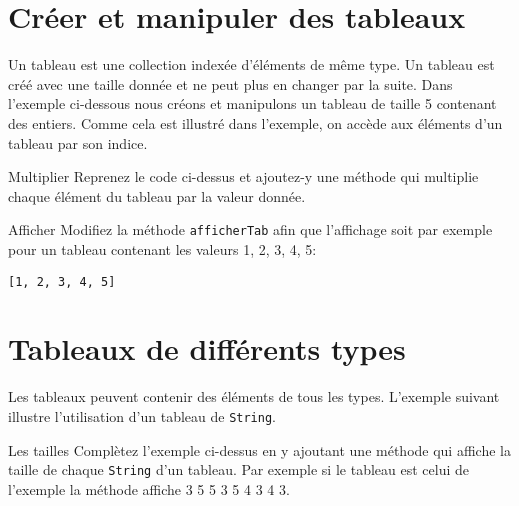 \documentclass[a4paper,11pt]{style-esi/td}
\begin{document}
	 
\section{Créer et manipuler des tableaux}

	Un tableau est une collection indexée d'éléments de même type.
	Un tableau est créé avec une taille donnée et ne peut plus en changer 
	par la suite. Dans l'exemple ci-dessous nous créons et manipulons
	un tableau de taille 5 contenant des entiers.
	Comme cela est illustré dans l'exemple, on accède aux éléments 
	d'un tableau par son indice.

	\bigskip 


 	\begin{Exercice}{Multiplier}	
		Reprenez le code ci-dessus et ajoutez-y une méthode 
		 qui
		 multiplie chaque élément du tableau par la valeur donnée.
	\end{Exercice}
	
	\bigskip
	
	\begin{Exercice}{Afficher}
		Modifiez la méthode \texttt{afficherTab} afin que l'affichage soit par exemple pour un tableau contenant les valeurs 1, 2, 3, 4, 5:
		
		\texttt{[1, 2, 3, 4, 5]}
	\end{Exercice}


\section{Tableaux de différents types}
	Les tableaux peuvent contenir des éléments de tous les types.	
	L'exemple suivant illustre l'utilisation d'un tableau de \texttt{String}.




	\begin{Exercice}{Les tailles}	
		Complètez l'exemple ci-dessus en y ajoutant une méthode 
			qui affiche la taille de chaque \texttt{String} d'un
			 tableau. Par exemple si le tableau est celui de l'exemple la méthode 		
			 affiche 3 5 5 3 5 4 3 4 3.
	\end{Exercice}
	
\end{document}
